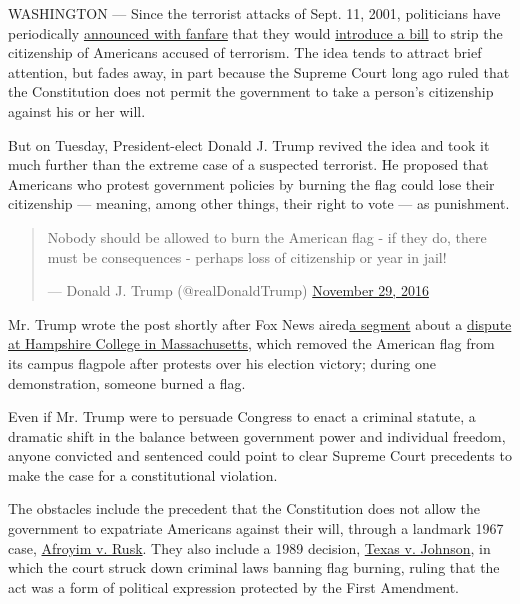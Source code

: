 WASHINGTON --- Since the terrorist attacks of Sept. 11, 2001,
politicians have periodically
\href{http://www.nytimes3xbfgragh.onion/2010/05/07/world/07rights.html}{announced
with fanfare} that they would
\href{http://www.cruz.senate.gov/files/documents/Bills/20140905_Expatriate_Terrorist_Act.pdf}{introduce
a bill} to strip the citizenship of Americans accused of terrorism. The
idea tends to attract brief attention, but fades away, in part because
the Supreme Court long ago ruled that the Constitution does not permit
the government to take a person's citizenship against his or her will.

But on Tuesday, President-elect Donald J. Trump revived the idea and
took it much further than the extreme case of a suspected terrorist. He
proposed that Americans who protest government policies by burning the
flag could lose their citizenship --- meaning, among other things, their
right to vote --- as punishment.

\begin{quote}
Nobody should be allowed to burn the American flag - if they do, there
must be consequences - perhaps loss of citizenship or year in jail!

--- Donald J. Trump (@realDonaldTrump)
\href{https://twitter.com/realDonaldTrump/status/803567993036754944?ref_src=twsrc\%5Etfw}{November
29, 2016}
\end{quote}

Mr. Trump wrote the post shortly after Fox News
aired\href{http://mms.tveyes.com/PlaybackPortal.aspx?SavedEditID=7e878902-48dd-4bc5-9726-266f8d700d30}{a
segment} about a
\href{http://www.nytimes3xbfgragh.onion/2016/11/28/us/hampshire-college-flag-veterans-protest.html}{dispute
at Hampshire College in Massachusetts}, which removed the American flag
from its campus flagpole after protests over his election victory;
during one demonstration, someone burned a flag.

Even if Mr. Trump were to persuade Congress to enact a criminal statute,
a dramatic shift in the balance between government power and individual
freedom, anyone convicted and sentenced could point to clear Supreme
Court precedents to make the case for a constitutional violation.

The obstacles include the precedent that the Constitution does not allow
the government to expatriate Americans against their will, through a
landmark 1967 case,
\href{https://scholar.google.com/scholar_case?case=2521246303796542623\&hl=en\&as_sdt=6\&as_vis=1\&oi=scholarr}{Afroyim
v. Rusk}. They also include a 1989 decision,
\href{https://www.law.cornell.edu/supremecourt/text/491/397}{Texas v.
Johnson}, in which the court struck down criminal laws banning flag
burning, ruling that the act was a form of political expression
protected by the First Amendment.

